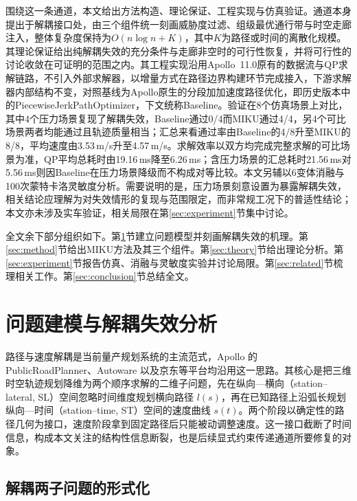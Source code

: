 \documentclass[a4paper,11pt]{ctexart}
\theoremstyle{definition}
\begin{document}
围绕这一条通道，本文给出方法构造、理论保证、工程实现与仿真验证。通道本身提出于解耦接口处，由三个组件统一刻画威胁度过滤、组级最优通行带与时空走廊注入，整体复杂度保持为$O(n\log n + K)$，其中$K$为路径或时间的离散化规模。其理论保证给出纯解耦失效的充分条件与走廊非空时的可行性恢复，并将可行性的讨论收敛在可证明的范围之内。其工程实现沿用Apollo~11.0原有的数据流与QP求解链路，不引入外部求解器，以增量方式在路径边界构建环节完成接入，下游求解器内部结构不变，对照基线为Apollo原生的分段加加速度路径优化，即历史版本中的PiecewiseJerkPathOptimizer，下文统称Baseline。验证在8个仿真场景上对比，其中4个压力场景复现了解耦失效，Baseline通过0/4而MIKU通过4/4，另4个可比场景两者均能通过且轨迹质量相当；汇总来看通过率由Baseline的4/8升至MIKU的8/8，平均速度由3.53\,m/s升至4.57\,m/s。求解效率以双方均完成完整求解的可比场景为准，QP平均总耗时由19.16\,ms降至6.26\,ms；含压力场景的汇总耗时21.56\,ms对5.56\,ms则因Baseline在压力场景降级而不构成对等比较。本文另辅以6变体消融与100次蒙特卡洛灵敏度分析。需要说明的是，压力场景刻意设置为暴露解耦失效，相关结论应理解为对失效情形的复现与范围限定，而非常规工况下的普适性结论；本文亦未涉及实车验证，相关局限在第\ref{sec:experiment}节集中讨论。

全文余下部分组织如下。第\ref{sec:problem}节建立问题模型并刻画解耦失效的机理。第\ref{sec:method}节给出MIKU方法及其三个组件。第\ref{sec:theory}节给出理论分析。第\ref{sec:experiment}节报告仿真、消融与灵敏度实验并讨论局限。第\ref{sec:related}节梳理相关工作。第\ref{sec:conclusion}节总结全文。

\section{问题建模与解耦失效分析}
\label{sec:problem}

路径与速度解耦是当前量产规划系统的主流范式，Apollo 的 PublicRoadPlanner、Autoware 以及京东等平台均沿用这一思路。其核心是把三维时空轨迹规划降维为两个顺序求解的二维子问题，先在纵向—横向（station--lateral, SL）空间忽略时间维度规划横向路径 $l(s)$，再在已知路径上沿弧长规划纵向—时间（station--time, ST）空间的速度曲线 $s(t)$。两个阶段以确定性的路径几何为接口，速度阶段拿到固定路径后只能被动调整速度。这一接口截断了时间信息，构成本文关注的结构性信息断裂，也是后续显式约束传递通道所要修复的对象。

\subsection{解耦两子问题的形式化}
\label{subsec:decouple_formalize}
\end{document}
